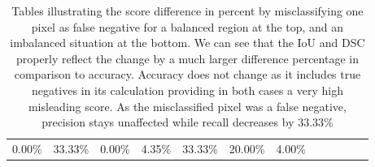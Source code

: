 \begin{table}[H]
{\begin{tabular}{llllllllllll}
      \multicolumn{1}{l|}{0.00\%} &
      \multicolumn{1}{l|}{33.33\%} &
      \multicolumn{1}{l|}{0.00\%} &
      \multicolumn{1}{l|}{4.35\%} &
      \multicolumn{1}{l|}{33.33\%} &
      \multicolumn{1}{l|}{20.00\%} &
      \multicolumn{1}{l|}{4.00\%} &
       &
       &
       &
       \\ \cline{1-8}
    \end{tabular}%
    }
    \caption[Metric comparison - False negative misclassification]{Tables illustrating the score difference in percent by misclassifying one pixel as false negative for a balanced region at the top, and an imbalanced situation at the bottom. We can see that the \ac{IoU} and \ac{DSC} properly reflect the change by a much larger difference percentage in comparison to accuracy. Accuracy does not change as it includes true negatives in its calculation providing in both cases a very high misleading score. As the misclassified pixel was a false negative, precision stays unaffected while recall decreases by $33.33\%$}
    \label{tab:metric_comparison_1}
    \end{table}